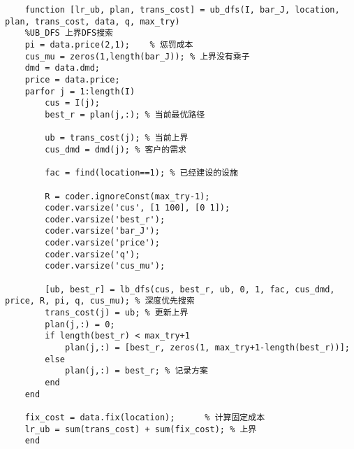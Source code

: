 {\begin{lstlisting}
    function [lr_ub, plan, trans_cost] = ub_dfs(I, bar_J, location, plan, trans_cost, data, q, max_try)
    %UB_DFS 上界DFS搜索
    pi = data.price(2,1);    % 惩罚成本
    cus_mu = zeros(1,length(bar_J)); % 上界没有乘子
    dmd = data.dmd;
    price = data.price;
    parfor j = 1:length(I)
        cus = I(j);
        best_r = plan(j,:); % 当前最优路径

        ub = trans_cost(j); % 当前上界
        cus_dmd = dmd(j); % 客户的需求
        
        fac = find(location==1); % 已经建设的设施

        R = coder.ignoreConst(max_try-1);
        coder.varsize('cus', [1 100], [0 1]);
        coder.varsize('best_r');
        coder.varsize('bar_J');
        coder.varsize('price');
        coder.varsize('q');
        coder.varsize('cus_mu');

        [ub, best_r] = lb_dfs(cus, best_r, ub, 0, 1, fac, cus_dmd, price, R, pi, q, cus_mu); % 深度优先搜索
        trans_cost(j) = ub; % 更新上界
        plan(j,:) = 0;
        if length(best_r) < max_try+1
            plan(j,:) = [best_r, zeros(1, max_try+1-length(best_r))];
        else
            plan(j,:) = best_r; % 记录方案
        end
    end

    fix_cost = data.fix(location);      % 计算固定成本
    lr_ub = sum(trans_cost) + sum(fix_cost); % 上界
    end
    
    \end{lstlisting}
}

\newpage
